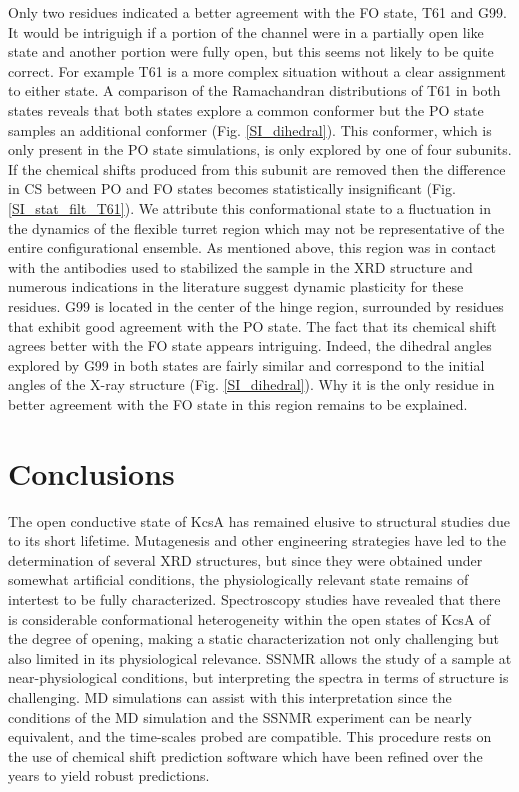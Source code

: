 \documentclass[%
 aip,
 amsmath,amssymb,
 preprint,%
]{revtex4-1}
\begin{document}
Only two residues indicated a better agreement with the FO state, T61 and G99. It would be intriguigh if a portion of the channel were in a partially open like state and another portion were fully open, but this seems not likely to be quite correct. For example T61 is a more complex situation without a clear assignment to either state. A comparison of the Ramachandran distributions of T61 in both states reveals that both states explore a common conformer but the PO state samples an additional conformer (Fig. \ref{SI_dihedral}). This conformer, which is only present in the PO state simulations, is only explored by one of four subunits. If the chemical shifts produced from this subunit are removed then the difference in CS between PO and FO states becomes statistically insignificant (Fig. \ref{SI_stat_filt_T61}). We attribute this conformational state to a fluctuation in the dynamics of the flexible turret region which may not be representative of the entire configurational ensemble. As mentioned above, this region was in contact with the antibodies used to stabilized the sample in the XRD structure and numerous indications in the literature suggest dynamic plasticity for these residues.\cite{Cuello2010}  G99 is located in the center of the hinge region, surrounded by residues that exhibit good agreement with the PO state.  The fact that its chemical shift agrees better with  the FO state appears intriguing. Indeed, the dihedral angles explored by G99 in both states are fairly similar and correspond to the initial angles of the X-ray structure (Fig. \ref{SI_dihedral}). Why it is the only residue in better agreement with the FO state in this region remains to be explained.



\section{Conclusions}

The open conductive state of KcsA has remained elusive to structural studies due to its short lifetime. Mutagenesis and other engineering strategies have led to the determination of several XRD structures, but since they were obtained under somewhat artificial conditions, the physiologically relevant state remains of intertest to be fully characterized. Spectroscopy studies have revealed that there is considerable conformational heterogeneity within the open states of KcsA of the degree of opening, making a static characterization not only challenging but also limited in its physiological relevance. SSNMR allows the study of a sample at near-physiological conditions, but interpreting the spectra in terms of structure is challenging. MD simulations can assist with this interpretation since the conditions of the MD simulation and the SSNMR experiment can be nearly equivalent, and the time-scales probed are compatible. This procedure rests on the use of chemical shift prediction software which have been refined over the years to yield robust predictions.
\end{document}
